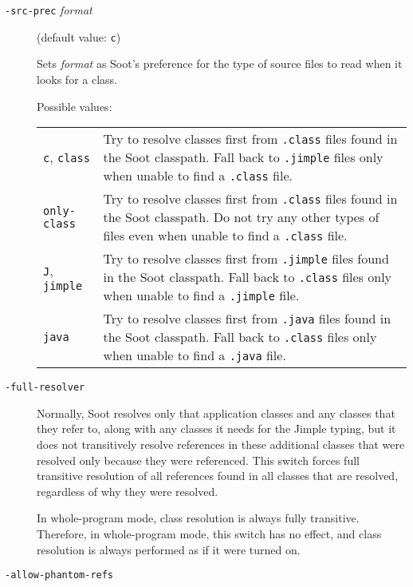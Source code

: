 \documentclass{article}
\begin{document}
\begin{description}
  \item[
  {\tt -src-prec}{ \it format}]

(default value: {\tt c})

Sets {\it format} as Soot's preference for the type of source files to read when
it looks for a class.




Possible values:\\
\begin{longtable}{p{1in}p{4in}}
{\tt c}, {\tt class} 
&

Try to resolve classes first from {\tt .class} files found in
the Soot classpath.  Fall back to {\tt .jimple} files
only when unable to find a {\tt .class} file.
\\
{\tt only-class} 
&

Try to resolve classes first from {\tt .class} files found in
the Soot classpath.  Do not try any other types of files even when
unable to find a {\tt .class} file.
\\
{\tt J}, {\tt jimple} 
&

Try to resolve classes first from {\tt .jimple} files found in
the Soot classpath.  Fall back to {\tt .class} files only when
unable to find a {\tt .jimple} file.
\\
{\tt java} 
&

Try to resolve classes first from {\tt .java} files found in
the Soot classpath.  Fall back to {\tt .class} files only when
unable to find a {\tt .java} file.
\\

\end{longtable}


  \item[
  {\tt -full-resolver}]

Normally, Soot resolves only that application classes and any classes that they
refer to, along with any classes it needs for the Jimple typing, but it does not
transitively resolve references in these additional classes that were resolved
only because they were referenced. This switch forces full transitive resolution
of all references found in all classes that are resolved, regardless of why they
were resolved.

In whole-program mode, class resolution is always fully transitive. Therefore,
in whole-program mode, this switch has no effect, and class resolution is
always performed as if it were turned on.



  \item[
  {\tt -allow-phantom-refs}]


\end{description}
\end{document}
